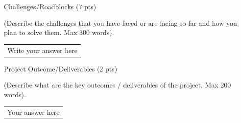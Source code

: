 \documentclass[12pt,a4paper]{article}
\newcommand{\sectiontitle}[1]{%
    {\color{GEUBlue}
    \fontsize{18}{22}\selectfont #1}
}
\newcommand{\instruction}[1]{%
    {\color{InstructionGrey}
    \fontsize{10.5}{13}\selectfont #1}
}
\newcommand{\answerbox}[2]{%
    \begin{tabularx}{\textwidth}{
        |>{\raggedright\arraybackslash}X|}
        \hline
        \parbox[t][#1][t]{\dimexpr\linewidth-12pt\relax}{
            \vspace{5pt}
            \fontsize{11}{13}\selectfont #2
        }\\
        \hline
    \end{tabularx}
}
\begin{document}
\sectiontitle{Challenges/Roadblocks (7 pts)}

\vspace{0.05cm}

\instruction{
(Describe the challenges that you have faced or are facing so far
and how you plan to solve them. Max 300 words).
}

\vspace{0.18cm}

\answerbox{4.05cm}{Write your answer here}

\vspace{0.65cm}











\vspace*{0.30cm}

\sectiontitle{Project Outcome/Deliverables (2 pts)}

\vspace{0.05cm}

\instruction{
(Describe what are the key outcomes / deliverables of the project.
Max 200 words).
}

\vspace{0.35cm}

\answerbox{3.35cm}{Your answer here}

\vspace{0.75cm}
\end{document}
